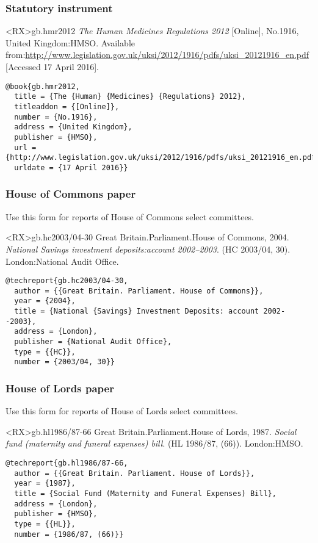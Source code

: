 \documentclass[10pt,a4paper]{article}
\begin{document}
\subsubsection*{Statutory instrument}

\begin{bibexbox}<RX>{gb.hmr2012}
  \emph{The Human Medicines Regulations 2012} [Online], No.1916, United Kingdom:\@ HMSO. Available from:\@ \url{http://www.legislation.gov.uk/uksi/2012/1916/pdfs/uksi_20121916_en.pdf} [Accessed 17 April 2016].
  \tcblower
\begin{Verbatim}
@book{gb.hmr2012,
  title = {The {Human} {Medicines} {Regulations} 2012},
  titleaddon = {[Online]},
  number = {No.1916},
  address = {United Kingdom},
  publisher = {HMSO},
  url = {http://www.legislation.gov.uk/uksi/2012/1916/pdfs/uksi_20121916_en.pdf},
  urldate = {17 April 2016}}
\end{Verbatim}
\end{bibexbox}



\subsubsection*{House of Commons paper}

Use this form for reports of House of Commons select committees.

\begin{bibexbox}<RX>{gb.hc2003/04-30}
  Great Britain.\@ Parliament.\@ House of Commons, 2004. \emph{National Savings investment deposits:\@ account 2002--2003}. (HC 2003/04, 30). London:\@ National Audit Office.
  \tcblower
\begin{Verbatim}
@techreport{gb.hc2003/04-30,
  author = {{Great Britain. Parliament. House of Commons}},
  year = {2004},
  title = {National {Savings} Investment Deposits: account 2002--2003},
  address = {London},
  publisher = {National Audit Office},
  type = {{HC}},
  number = {2003/04, 30}}
\end{Verbatim}
\end{bibexbox}

\subsubsection*{House of Lords paper}

Use this form for reports of House of Lords select committees.

\begin{bibexbox}<RX>{gb.hl1986/87-66}
  Great Britain.\@ Parliament.\@ House of Lords, 1987. \emph{Social fund (maternity and funeral expenses) bill}. (HL 1986/87, (66)). London:\@ HMSO.
  \tcblower
\begin{Verbatim}
@techreport{gb.hl1986/87-66,
  author = {{Great Britain. Parliament. House of Lords}},
  year = {1987},
  title = {Social Fund (Maternity and Funeral Expenses) Bill},
  address = {London},
  publisher = {HMSO},
  type = {{HL}},
  number = {1986/87, (66)}}
\end{Verbatim}
\end{bibexbox}
\end{document}
